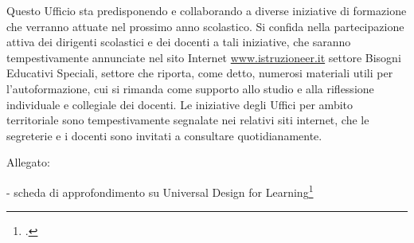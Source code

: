 \begin{description}
 Questo Ufficio sta predisponendo e collaborando a diverse iniziative di formazione che verranno
 attuate nel prossimo anno scolastico. Si confida nella partecipazione attiva dei dirigenti scolastici e dei
 docenti a tali iniziative, che saranno tempestivamente annunciate nel sito Internet \url{www.istruzioneer.it}
 settore Bisogni Educativi Speciali, settore che riporta, come detto, numerosi materiali utili per
 l'autoformazione, cui si rimanda come supporto allo studio e alla riflessione individuale e collegiale dei
 docenti. Le iniziative degli Uffici per ambito territoriale sono tempestivamente segnalate nei relativi
 siti internet, che le segreterie e i docenti sono invitati a consultare quotidianamente.
\end{description}
	

Allegato:

- scheda di approfondimento su Universal Design for Learning\footcite{USRperLEmiliaRomagna2013c}
